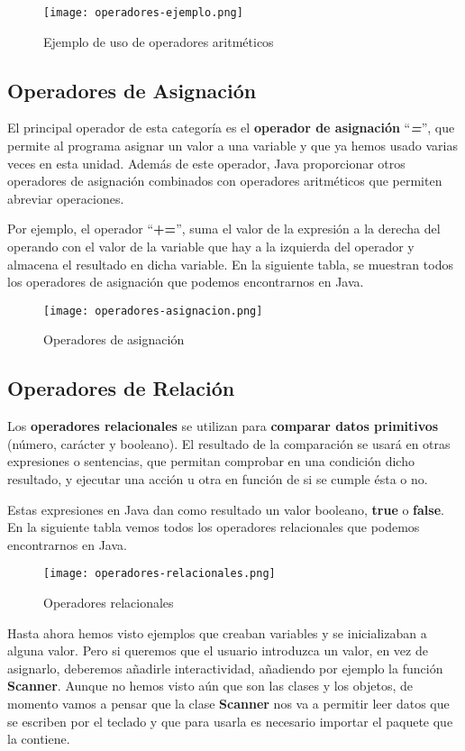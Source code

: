 \begin{figure}[H]
    \centering
    \texttt{[image: operadores-ejemplo.png]}
    \caption{Ejemplo de uso de operadores aritméticos}
\end{figure}

\subsection{Operadores de Asignación}
El principal operador de esta categoría es el \textbf{operador de asignación} ``\textbf{\textit{=}}'', que permite al programa asignar un valor a una variable y que ya hemos usado varias veces en esta unidad. Además de este operador, Java proporcionar otros operadores de asignación combinados con operadores aritméticos que permiten abreviar operaciones.

Por ejemplo, el operador ``\textbf{+=}'', suma el valor de la expresión a la derecha del operando con el valor de la variable que hay a la izquierda del operador y almacena el resultado en dicha variable. En la siguiente tabla, se muestran todos los operadores de asignación que podemos encontrarnos en Java.

\begin{figure}[H]
    \centering
    \texttt{[image: operadores-asignacion.png]}
    \caption{Operadores de asignación}
\end{figure}

\subsection{Operadores de Relación}
Los \textbf{operadores relacionales} se utilizan para \textbf{comparar datos primitivos} (número, carácter y booleano). El resultado de la comparación se usará en otras expresiones o sentencias, que permitan comprobar en una condición dicho resultado, y ejecutar una acción u otra en función de si se cumple ésta o no.

Estas expresiones en Java dan como resultado un valor booleano, \textbf{true} o \textbf{false}. En la siguiente tabla vemos todos los operadores relacionales que podemos encontrarnos en Java.

\begin{figure}[H]
    \centering
    \texttt{[image: operadores-relacionales.png]}
    \caption{Operadores relacionales}
\end{figure}

Hasta ahora hemos visto ejemplos que creaban variables y se inicializaban a alguna valor. Pero si queremos que el usuario introduzca un valor, en vez de asignarlo, deberemos añadirle interactividad, añadiendo por ejemplo la función
\textbf{Scanner}. Aunque no hemos visto aún que son las clases y los objetos, de momento vamos a pensar que la clase \textbf{Scanner} nos va a permitir leer datos que se escriben por el teclado y que para usarla es necesario importar el paquete que la contiene.

